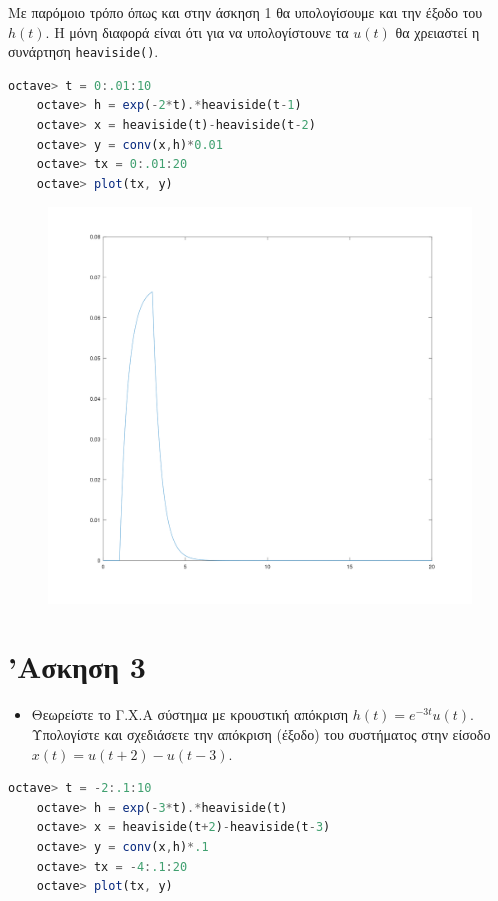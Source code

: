 \documentclass{article}
\begin{document}
Με παρόμοιο τρόπο όπως και στην άσκηση 1 θα υπολογίσουμε και την έξοδο
του $h(t)$. Η μόνη διαφορά είναι ότι για να υπολογίστουνε τα $u(t)$
θα χρειαστεί η συνάρτηση \lstinline{heaviside()}.

\begin{lstlisting}[language=octave]
	octave> t = 0:.01:10
	octave> h = exp(-2*t).*heaviside(t-1)
	octave> x = heaviside(t)-heaviside(t-2)
	octave> y = conv(x,h)*0.01
	octave> tx = 0:.01:20
	octave> plot(tx, y)
\end{lstlisting}

\begin{figure}[H]
	\centering
	\includegraphics[width=\linewidth]{res/fig2.png}
\end{figure}

\section{'Ασκηση 3}

\begin{itemize}
        \item Θεωρείστε το Γ.Χ.Α σύστημα με κρουστική απόκριση
		$h(t) = e^{-3t}u(t)$. Υπολογίστε και σχεδιάσετε την
		απόκριση (έξοδο) του συστήματος στην είσοδο
		$x(t) = u(t + 2) - u(t - 3)$.
\end{itemize}

\begin{lstlisting}[language=octave]
	octave> t = -2:.1:10
	octave> h = exp(-3*t).*heaviside(t)
	octave> x = heaviside(t+2)-heaviside(t-3)
	octave> y = conv(x,h)*.1
	octave> tx = -4:.1:20
	octave> plot(tx, y)
\end{lstlisting}
\end{document}
